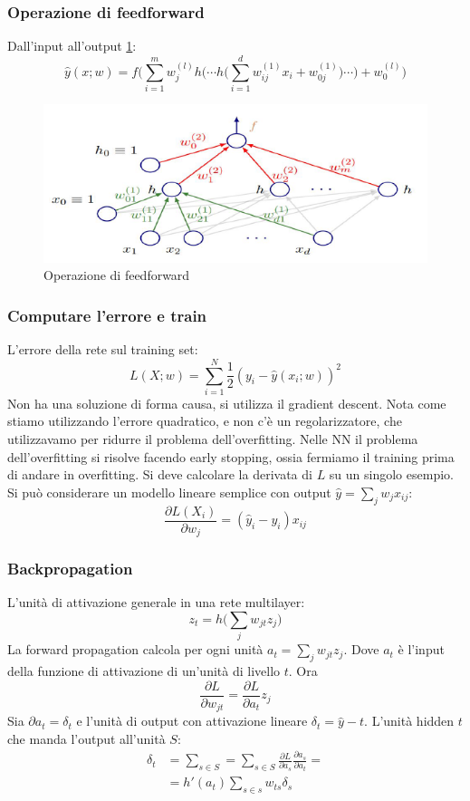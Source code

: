 		\subsubsection{Operazione di feedforward}
		Dall'input all'output \ref{fig:chapter11-09}:
		$$\hat{y}(x;w) = f\bigl(\sum\limits_{i=1}^mw_j^{(l)}h\bigl(\cdots h\bigl(\sum\limits_{i = 1}^dw_{ij}^{(1)}x_i + w_{0j}^{(1)}\bigr)\cdots\bigr) + w_0^{(l)}\bigr)$$
		
		\begin{figure}
			\centering
			\includegraphics[width=0.6\linewidth]{imgs/chapter11/img9}
			\caption{Operazione di feedforward}
			\label{fig:chapter11-09}
		\end{figure}

		\subsubsection{Computare l'errore e train}
		L'errore della rete sul training set:
		$$L(X;w) = \sum\limits_{i=1}^N\frac{1}{2}(y_i-\hat{y}(x_i;w))^2$$
		Non ha una soluzione di forma causa, si utilizza il gradient descent. Nota come stiamo utilizzando l'errore quadratico, e non c'\`e un regolarizzatore, che utilizzavamo per ridurre il problema dell'overfitting. Nelle NN il problema dell'overfitting si risolve facendo early stopping, ossia fermiamo il training prima di andare in overfitting.
		Si deve calcolare la derivata di $L$ su un singolo esempio.
		Si pu\`o considerare un modello lineare semplice con output $\hat{y} = \sum\limits_jw_jx_{ij}$:
		$$\frac{\partial L(X_i)}{\partial w_j} = (\hat{y}_i -y_i)x_{ij}$$

		\subsubsection{Backpropagation}
		L'unit\`a di attivazione generale in una rete multilayer:
		$$z_t = h\bigl(\sum\limits_jw_{jt}z_j\bigr)$$
		La forward propagation calcola per ogni unit\`a $a_t = \sum\limits_j w_{jt}z_j$.
		Dove $a_t$ \`e l'input della funzione di attivazione di un'unit\`a di livello $t$.
		Ora
		$$\frac{\partial L}{\partial w_{jt}} = \frac{\partial L}{\partial a_t}z_j$$
		Sia $\partial a_t = \delta_t$ e l'unit\`a di output con attivazione lineare $\delta_t = \hat{y} -t$.
		L'unit\`a hidden $t$ che manda l'output all'unit\`a $S$:
		\begin{align*}
			\delta_t &= \sum\limits_{s\in S} = \sum\limits_{s\in S}\frac{\partial L}{\partial a_s}\frac{\partial a_s}{\partial a_t}=\\
			&= h'(a_t)\sum\limits_{s\in s} w_{ts}\delta_s
		\end{align*}

